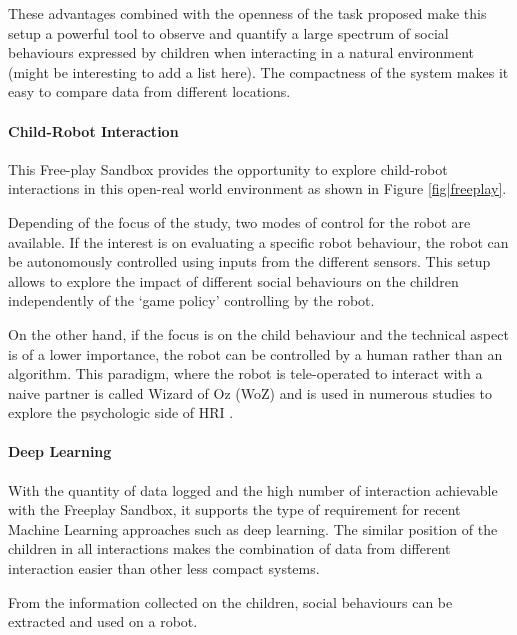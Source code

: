 \documentclass[sigconf]{acmart}
\begin{document}
These advantages combined with the openness of the task proposed make this setup a powerful tool to observe and quantify a large spectrum of social behaviours expressed by children when interacting in a natural environment (might be interesting to add a list here). The compactness of the system makes it easy to compare data from different locations.

\paragraph{Child-Robot Interaction}
\label{ssec|CRI}
This Free-play Sandbox provides the opportunity to explore child-robot
interactions in this open-real world environment as shown in Figure
\ref{fig|freeplay}. 

Depending of the focus of the study, two modes of control for the robot are
available. If the interest is on evaluating a specific robot behaviour, the
robot can be autonomously controlled using inputs from the different sensors.
This setup allows to explore the impact of different social behaviours on the
children independently of the `game policy' controlling by the robot. 

On the other hand, if the focus is on the child behaviour and the technical
aspect is of a lower importance, the robot can be controlled by a human rather
than an algorithm. This paradigm, where the robot is tele-operated to interact
with a naive partner is called Wizard of Oz (WoZ) and is used in numerous
studies to explore the psychologic side of HRI \cite{riek2012wizard}. 

\paragraph{Deep Learning}

With the quantity of data logged and the high number of interaction achievable with the Freeplay Sandbox, it supports the type of requirement for recent Machine Learning approaches such as deep learning. The similar position of the children in all interactions makes the combination of data from different interaction easier than other less compact systems.

From the information collected on the children, social behaviours can be extracted and used on a robot.

\end{document}
